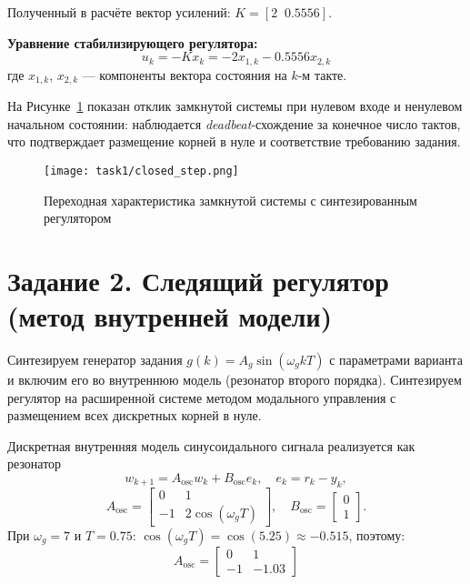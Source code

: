 Полученный в расчёте вектор усилений: $K=[2\;\;0.5556]$. 

\textbf{Уравнение стабилизирующего регулятора:}
\[
u_k = -K x_k = -2 x_{1,k} - 0.5556 x_{2,k}
\]
где $x_{1,k}$, $x_{2,k}$ — компоненты вектора состояния на $k$-м такте.

На Рисунке~\ref{fig:task1_closed} показан отклик замкнутой системы при нулевом входе и ненулевом начальном состоянии: наблюдается \textit{deadbeat}-схождение за конечное число тактов, что подтверждает размещение корней в нуле и соответствие требованию задания.

\begin{figure}[H]
    \centering
    \texttt{[image: task1/closed\_step.png]}
    \caption{Переходная характеристика замкнутой системы с синтезированным регулятором}
    \label{fig:task1_closed}
\end{figure}

\section{Задание 2. Следящий регулятор (метод внутренней модели)}
Синтезируем генератор задания $g(k)=A_g\sin(\omega_g k T)$ с параметрами варианта и включим его во внутреннюю модель (резонатор второго порядка). Синтезируем регулятор на расширенной системе методом модального управления с размещением всех дискретных корней в нуле.

Дискретная внутренняя модель синусоидального сигнала реализуется как резонатор
\[
 w_{k+1} = A_{\text{osc}} w_k + B_{\text{osc}} e_k,\quad e_k = r_k - y_k,
\]
\[
 A_{\text{osc}} = \begin{bmatrix}0 & 1\\ -1 & 2\cos(\omega_g T)\end{bmatrix},\quad B_{\text{osc}}=\begin{bmatrix}0\\1\end{bmatrix}.
\]
При $\omega_g=7$ и $T=0.75$: $\cos(\omega_g T) = \cos(5.25) \approx -0.515$, поэтому:
\[
A_{\text{osc}} = \begin{bmatrix}0 & 1\\ -1 & -1.03\end{bmatrix}
\]

